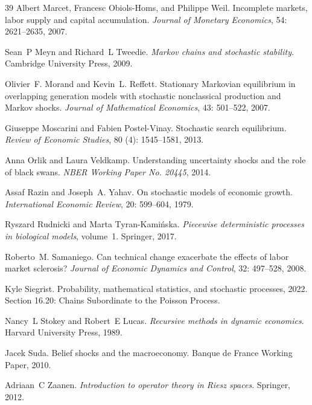 \documentclass[12pt,reqno]{amsart}
\numberwithin{equation}{section}
\theoremstyle{definition}
\newcommand{\1}{\mathbbm{1}}
\begin{document}
\begin{thebibliography}{39}
Albert Marcet, Francesc Obiols-Homs, and Philippe Weil.
\newblock Incomplete markets, labor supply and capital accumulation.
\newblock \emph{Journal of Monetary Economics}, 54: 2621--2635, 2007.

Sean~P Meyn and Richard~L Tweedie.
\newblock \emph{Markov chains and stochastic stability}.
\newblock Cambridge University Press, 2009.

Olivier~F. Morand and Kevin~L. Reffett.
\newblock Stationary {M}arkovian equilibrium in overlapping generation models with stochastic nonclassical production and {M}arkov shocks.
\newblock \emph{Journal of Mathematical Economics}, 43: 501--522, 2007.

Giuseppe Moscarini and Fabien Postel-Vinay.
\newblock Stochastic search equilibrium.
\newblock \emph{Review of Economic Studies}, 80 (4): 1545--1581, 2013.

Anna Orlik and Laura Veldkamp.
\newblock Understanding uncertainty shocks and the role of black swans.
\newblock \emph{NBER Working Paper No. 20445}, 2014.

Assaf Razin and Joseph~A. Yahav.
\newblock On stochastic models of economic growth.
\newblock \emph{International Economic Review}, 20: 599--604, 1979.

Ryszard Rudnicki and Marta Tyran-Kami{\'n}ska.
\newblock \emph{Piecewise deterministic processes in biological models}, volume~1.
\newblock Springer, 2017.

Roberto~M. Samaniego.
\newblock Can technical change exacerbate the effects of labor market sclerosis?
\newblock \emph{Journal of Economic Dynamics and Control}, 32: 497--528, 2008.

Kyle Siegrist.
\newblock Probability, mathematical statistics, and stochastic processes, 2022.
\newblock Section 16.20: Chains Subordinate to the Poisson Process.

Nancy~L Stokey and Robert~E Lucas.
\newblock \emph{Recursive methods in dynamic economics}.
\newblock Harvard University Press, 1989.

Jacek Suda.
\newblock Belief shocks and the macroeconomy.
\newblock Banque de France Working Paper, 2010.

Adriaan~C Zaanen.
\newblock \emph{Introduction to operator theory in Riesz spaces}.
\newblock Springer, 2012.

\end{thebibliography}
\end{document}

